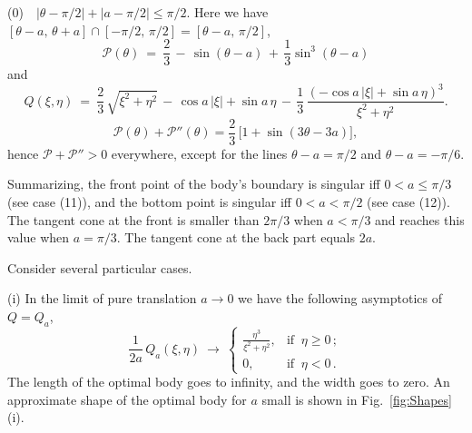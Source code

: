 \documentclass[a4paper,12pt]{article}
\newcommand {\PPP}{\mathcal{P}}
\theoremstyle{remark}
\theoremstyle{definition}
\begin{document}
(0)~~$|\theta-\pi/2|+|a-\pi/2|\le \pi/2$. Here we have $[\theta-a,\, \theta+a]\cap[-\pi/2,\, \pi/2]=[\theta-a,\, \pi/2]$,
$$
\PPP(\theta)\ =\ \frac{2}{3}\, -\, \sin(\theta-a)\, +\, \frac{1}{3} \sin^3(\theta-a)
$$ and $$
Q(\xi, \eta)\ = \ \frac{2}{3}\, \sqrt{\xi^2 + \eta^2}\, -\, \cos a\, |\xi| + \sin a\, \eta\, -\, \frac{1}{3}\, \frac{(-\cos a\, |\xi| + \sin a\, \eta)^3}{\xi^2 + \eta^2}.
$$
$$\PPP(\theta)+\PPP''(\theta)= \frac{2}{3}\,\big[1+\sin(3\theta-3a)\big],$$
hence $\PPP+\PPP''>0$ everywhere, except for the lines $\theta-a=\pi/2$ and $\theta-a=-\pi/6.$
\vspace{2mm}

Summarizing, the front point of the body's boundary is singular iff $0<a\le\pi/3$ (see case (11)), and the bottom point is singular iff $0<a<\pi/2$ (see case (12)). The tangent cone at the front is smaller than $2\pi/3$ when $a<\pi/3$ and reaches this value when $a=\pi/3$. The tangent cone at the back part equals $2a.$


Consider several particular cases.
\vspace{2mm}

(i) In the limit of pure translation $a \to 0$ we have the following asymptotics of $Q=Q_a$,
$$
\frac{1}{2a}\, Q_a(\xi,\eta)\ \to \ \left\{
\begin{array}{ll}
	\frac{\eta^3}{\xi^2 + \eta^2}, & \text{if } \ \eta \ge 0\,;\\
	0, & \text{if } \ \eta < 0\,.
\end{array}
\right.
$$
The length of the optimal body goes to infinity, and the width goes to zero. An approximate shape of the optimal body for $a$ small is shown in Fig.~\ref{fig:Shapes}\,(i).
\vspace{2mm}
\end{document}
